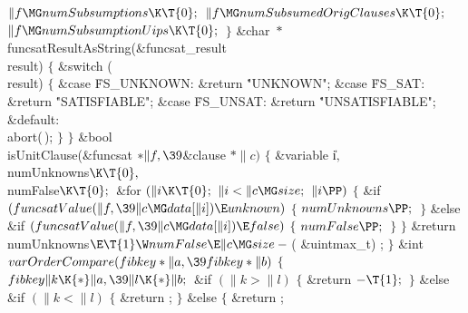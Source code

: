 {{{{{${}\|f\MG\\{numSubsumptions}\K\T{0};{}$\6
${}\|f\MG\\{numSubsumedOrigClauses}\K\T{0};{}$\6
${}\|f\MG\\{numSubsumptionUips}\K\T{0};{}$\6
\4${}\}{}$\2\7
\&{char} ${}{*}{}$\\{funcsatResultAsString}(\&{funcsat\_result} \\{result})\1\1%
\2\2\6
${}\{{}$\1\6
\&{switch} (\\{result})\5
${}\{{}$\1\6
\4\&{case} \.{FS\_UNKNOWN}:\5
\&{return} \.{"UNKNOWN"};\6
\4\&{case} \.{FS\_SAT}:\5
\&{return} \.{"SATISFIABLE"};\6
\4\&{case} \.{FS\_UNSAT}:\5
\&{return} \.{"UNSATISFIABLE"};\6
\4\&{default}:\5
\\{abort}(\,);\6
\4${}\}{}$\2\6
\4${}\}{}$\2\7
\&{bool} \\{isUnitClause}(\&{funcsat} ${}{*}\|f,\39{}$\&{clause} ${}{*}\|c){}$%
\1\1\2\2\6
${}\{{}$\1\6
\&{variable} \|i${},{}$ \\{numUnknowns}${}\K\T{0},{}$ \\{numFalse}${}\K%
\T{0};{}$\7
\&{for} ${}(\|i\K\T{0};{}$ ${}\|i<\|c\MG\\{size};{}$ ${}\|i\PP){}$\5
${}\{{}$\1\6
\&{if} ${}(\\{funcsatValue}(\|f,\39\|c\MG\\{data}[\|i])\E\\{unknown}){}$\5
${}\{{}$\1\6
${}\\{numUnknowns}\PP;{}$\6
\4${}\}{}$\2\6
\&{else} \&{if} ${}(\\{funcsatValue}(\|f,\39\|c\MG\\{data}[\|i])\E\\{false}){}$%
\5
${}\{{}$\1\6
${}\\{numFalse}\PP;{}$\6
\4${}\}{}$\2\6
\4${}\}{}$\2\6
\&{return} \\{numUnknowns}${}\E\T{1}\W\\{numFalse}\E\|c\MG\\{size}-{}$(%
\&{uintmax\_t}) ;\6
\4${}\}{}$\2\7
\&{int} ${}\\{varOrderCompare}(\\{fibkey}*\|a,\39\\{fibkey}*\|b){}$\1\1\2\2\6
${}\{{}$\1\6
${}\\{fibkey}\|k\K{*}\|a,\39\|l\K{*}\|b;{}$\6
\&{if} ${}(\|k>\|l){}$\5
${}\{{}$\1\6
\&{return} ${}{-}\T{1};{}$\6
\4${}\}{}$\2\6
\&{else} \&{if} ${}(\|k<\|l){}$\5
${}\{{}$\1\6
\&{return} ;\6
\4${}\}{}$\2\6
\&{else}\5
${}\{{}$\1\6
\&{return} ;\6
}}}}}
